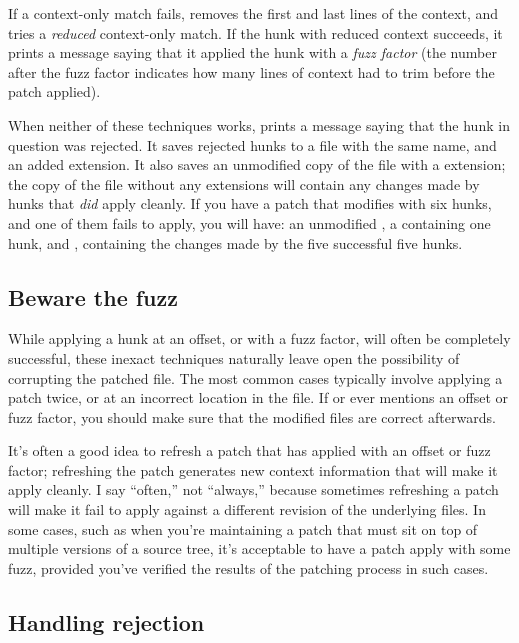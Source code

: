 If a context-only match fails,  removes the first and
last lines of the context, and tries a \emph{reduced} context-only
match.  If the hunk with reduced context succeeds, it prints a message
saying that it applied the hunk with a \emph{fuzz factor} (the number
after the fuzz factor indicates how many lines of context
 had to trim before the patch applied).

When neither of these techniques works,  prints a
message saying that the hunk in question was rejected.  It saves
rejected hunks to a file with the same name, and an added
 extension.  It also saves an unmodified copy of the
file with a  extension; the copy of the file without
any extensions will contain any changes made by hunks that \emph{did}
apply cleanly.  If you have a patch that modifies  with
six hunks, and one of them fails to apply, you will have: an
unmodified , a  containing one
hunk, and , containing the changes made by the five
successful five hunks.

\subsection{Beware the fuzz}

While applying a hunk at an offset, or with a fuzz factor, will often
be completely successful, these inexact techniques naturally leave
open the possibility of corrupting the patched file.  The most common
cases typically involve applying a patch twice, or at an incorrect
location in the file.  If  or  ever
mentions an offset or fuzz factor, you should make sure that the
modified files are correct afterwards.  

It's often a good idea to refresh a patch that has applied with an
offset or fuzz factor; refreshing the patch generates new context
information that will make it apply cleanly.  I say ``often,'' not
``always,'' because sometimes refreshing a patch will make it fail to
apply against a different revision of the underlying files.  In some
cases, such as when you're maintaining a patch that must sit on top of
multiple versions of a source tree, it's acceptable to have a patch
apply with some fuzz, provided you've verified the results of the
patching process in such cases.

\subsection{Handling rejection}

